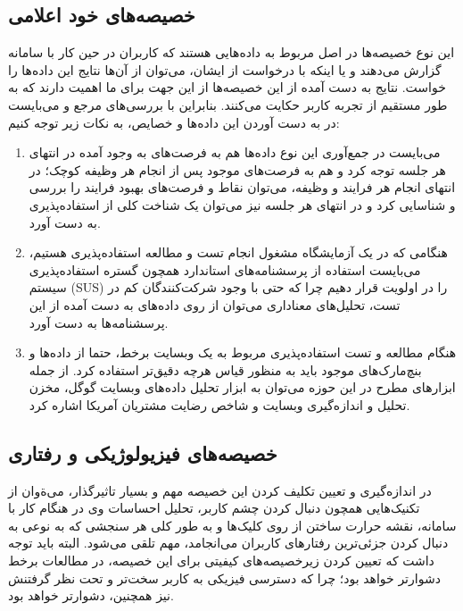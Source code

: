 \subsection{خصیصه‌های خود اعلامی}
این نوع خصیصه‌ها در اصل مربوط به داده‌هایی هستند که کاربران در حین کار با سامانه گزارش می‌دهند و یا اینکه با درخواست از ایشان، می‌توان از آن‌ها نتایج این داده‌ها را خواست. نتایج به دست آمده از این خصیصه‌ها از این جهت برای ما اهمیت دارند که به طور مستقیم از تجربه کاربر حکایت می‌کنند. بنابراین با بررسی‌های مرجع
\cite{albert_measuring_2013} و
\cite{pressman_software_2015}
می‌بایست در به دست آوردن این داده‌ها و خصایص، به نکات زیر توجه کنیم:
\begin{enumerate}
	\item
	می‌بایست در جمع‌آوری این نوع داده‌ها هم به فرصت‌های به وجود آمده در انتهای هر جلسه توجه کرد و هم به فرصت‌های موجود پس از انجام هر وظیفه کوچک؛ در انتهای انجام هر فرایند و وظیفه، می‌توان نقاط و فرصت‌های بهبود فرایند را بررسی و شناسایی کرد و در انتهای هر جلسه نیز می‌توان یک شناخت کلی از استفاده‌پذیری به دست آورد.
	\item 
	هنگامی که در یک آزمایشگاه مشغول انجام تست و مطالعه استفاده‌پذیری هستیم، می‌بایست استفاده از پرسشنامه‌های استاندارد همچون گستره استفاده‌پذیری سیستم (SUS)
را در اولویت قرار دهیم چرا که حتی با وجود شرکت‌کنندگان کم در تست، تحلیل‌های معناداری می‌توان از روی داده‌های به دست آمده از این پرسشنامه‌ها به دست آورد.
\item 
هنگام مطالعه و تست استفاده‌پذیری مربوط به یک وبسایت برخط، حتما از داده‌ها و بنچ‌مارک‌های موجود باید به منظور قیاس هرچه دقیق‌تر استفاده کرد. از جمله ابزارهای مطرح در این حوزه می‌توان به ابزار تحلیل داده‌های وبسایت گوگل،
مخزن تحلیل و اندازه‌گیری وبسایت و شاخص رضایت مشتریان آمریکا اشاره کرد.
\end{enumerate}
\subsection{خصیصه‌های فیزیولوژیکی و رفتاری}
در اندازه‌گیری و تعیین تکلیف کردن این خصیصه مهم و بسیار تاثیرگذار، می‌ةوان از تکنیک‌هایی همچون دنبال کردن چشم کاربر، تحلیل احساسات وی در هنگام کار با سامانه، نقشه حرارت ساختن از روی کلیک‌ها و به طور کلی هر سنجشی که به نوعی به دنبال کردن جزئی‌ترین رفتارهای کاربران می‌انجامد، مهم تلقی می‌شود. البته باید توجه داشت که تعیین کردن زیرخصیصه‌های کیفیتی برای این خصیصه، در مطالعات برخط دشوارتر خواهد بود؛ چرا که دسترسی فیزیکی به کاربر سخت‌تر و تحت نظر گرفتنش نیز همچنین، دشوارتر خواهد بود.
